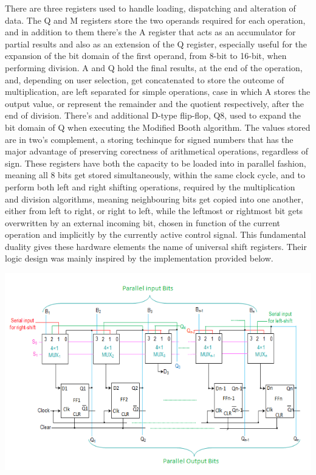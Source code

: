\documentclass[12pt, letterpaper]{article}
\begin{document}
There are three registers used to handle loading, dispatching and alteration of data. The Q and M registers store the two operands required for each operation, and
in addition to them there's the A register that acts as an accumulator for partial results and also as an extension of the Q register, especially useful
for the expansion of the bit domain of the first operand, from 8-bit to 16-bit, when performing division. A and Q hold the final results, at the end of the
operation, and, depending on user selection, get concatenated to store the outcome of multiplication, are left separated for simple operations, case in which A stores the output
value, or represent the remainder and the quotient respectively, after the end of division. There's and additional D-type flip-flop, Q8, used to expand the bit
domain of Q when executing the Modified Booth algorithm.
The values stored are in two's complement, a storing
techinque for signed numbers that has the major advantage of preserving corectness of arithmetical operations, regardless of sign. These registers have both
the capacity to be loaded into in parallel fashion, meaning all 8 bits get stored simultaneously, within the same clock cycle, and to perform both left and right
shifting operations, required by the multiplication and division algorithms, meaning neighbouring bits get copied into one another, either from
left to right, or right to left, while the leftmost or rightmost bit gets overwritten by an external incoming bit, chosen in function of the current
operation and implicitly by the currently active control signal. This fundamental duality gives these hardware elements the name of universal shift registers. Their
logic design was mainly inspired by the implementation provided below. 

\begin{center}
\includegraphics[scale=0.8]{Documentation/registers}
\end{center}
\end{document}
